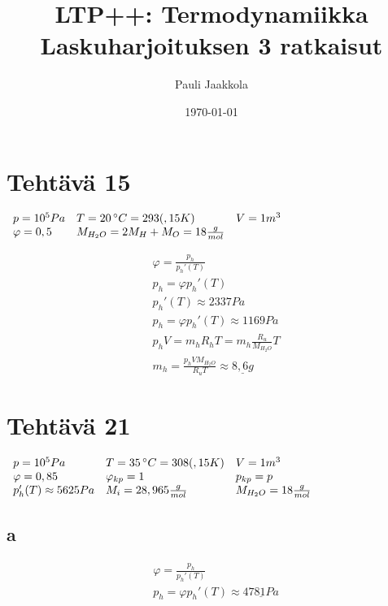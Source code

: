 \documentclass[12pt,a4paper,finnish]{article}
\title{LTP++: Termodynamiikka\\Laskuharjoituksen 3 ratkaisut}
\date{\today}
\author{Pauli Jaakkola}
\begin{document}
\maketitle
\tableofcontents
\newpage

\section{Tehtävä 15}

\begin{math}
\begin{array}{l l l}
 p = 10^5 Pa & T = 20 \,^{\circ}C = 293(,15 K) & V = 1 m^3\\
 \varphi = 0,5 & M_{H_2O} = 2M_H + M_O = 18 \frac{g}{mol} & 
\end{array}
\end{math}

\begin{align}
 &\varphi = \frac{p_h}{p_h'(T)}\\
 &p_h = \varphi p_h'(T)\\
 &p_h'(T) \approx 2337 Pa\\
 &p_h = \varphi p_h'(T) \approx 1169 Pa\\
 &p_hV = m_hR_hT = m_h\frac{R_u}{M_{H_2O}}T\\
 &m_h = \frac{p_hVM_{H_2O}}{R_uT} \approx \underline{8,6 g}
\end{align}

\section{Tehtävä 21}

\begin{math}
 \begin{array}{l l l}
  p = 10^5 Pa & T = 35 \,^{\circ}C = 308(,15 K) & V = 1 m^3\\
  \varphi = 0,85 & \varphi_{kp} = 1 & p_{kp} = p\\
  p_h'(T) \approx 5625 Pa & M_i = 28,965\frac{g}{mol} & M_{H_2O} = 18\frac{g}{mol}
 \end{array}
\end{math}

\subsection{a}

\begin{align}
 &\varphi = \frac{p_h}{p_h'(T)}\\
 &p_h = \varphi p_h'(T) \approx \underline{4781 Pa}
\end{align}
\end{document}
